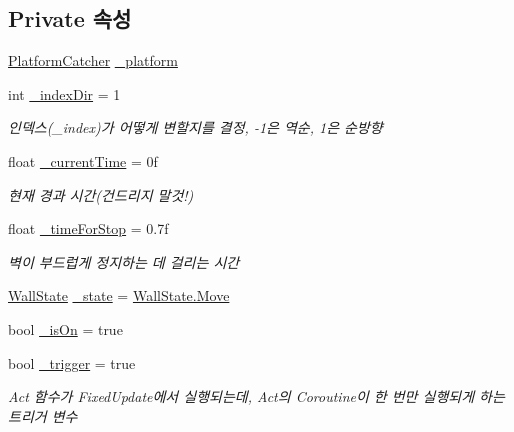 \subsection*{Private 속성}
\begin{DoxyCompactItemize}
\item 
\mbox{\hyperlink{class_platform_catcher}{Platform\+Catcher}} \mbox{\hyperlink{class_moving_platform_a2269ebd689de9ad6368f64b6b14cecb6}{\+\_\+platform}}
\item 
int \mbox{\hyperlink{class_moving_platform_a885973335ac91f8c34289d38f2d88d93}{\+\_\+index\+Dir}} = 1
\begin{DoxyCompactList}\small\item\em 인덱스(\+\_\+index)가 어떻게 변할지를 결정, -\/1은 역순, 1은 순방향 \end{DoxyCompactList}\item 
float \mbox{\hyperlink{class_moving_platform_a5c9c4e39da03c1aef1abde75a137831c}{\+\_\+current\+Time}} = 0f
\begin{DoxyCompactList}\small\item\em 현재 경과 시간(건드리지 말것!) \end{DoxyCompactList}\item 
float \mbox{\hyperlink{class_moving_platform_a69791dc347a05d5513e82cd445640cf4}{\+\_\+time\+For\+Stop}} = 0.\+7f
\begin{DoxyCompactList}\small\item\em 벽이 부드럽게 정지하는 데 걸리는 시간 \end{DoxyCompactList}\item 
\mbox{\hyperlink{class_moving_platform_ac47e764b71989317aab0bad26d82a901}{Wall\+State}} \mbox{\hyperlink{class_moving_platform_abd03a1d4800fd5fa8ab4ef8ce5a688db}{\+\_\+state}} = \mbox{\hyperlink{class_moving_platform_ac47e764b71989317aab0bad26d82a901a6bc362dbf494c61ea117fe3c71ca48a5}{Wall\+State.\+Move}}
\item 
bool \mbox{\hyperlink{class_moving_platform_a6721f91607e56294fb807a00ccfaafad}{\+\_\+is\+On}} = true
\item 
bool \mbox{\hyperlink{class_moving_platform_a98e69f4b8bfe702ef2bc6a8d77a03b8a}{\+\_\+trigger}} = true
\begin{DoxyCompactList}\small\item\em Act 함수가 Fixed\+Update에서 실행되는데, Act의 Coroutine이 한 번만 실행되게 하는 트리거 변수 \end{DoxyCompactList}\end{DoxyCompactItemize}


